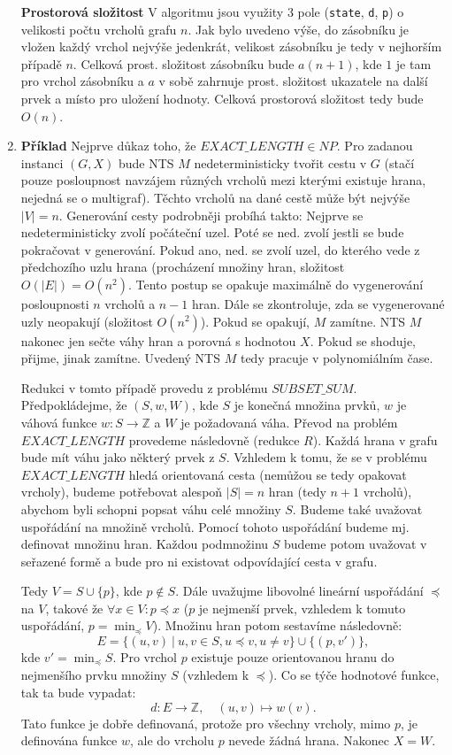 \documentclass[a4paper,12pt]{article}
\begin{document}
\begin{enumerate}[label=\textbf{\arabic*}.]
  \textbf{Prostorová složitost} 
  V algoritmu jsou využity 3 pole (\texttt{state}, \texttt{d}, \texttt{p}) o velikosti počtu vrcholů grafu $n$. Jak bylo uvedeno výše, do zásobníku je vložen
  každý vrchol nejvýše jedenkrát, velikost zásobníku je tedy v nejhorším případě $n$. Celková prost. složitost zásobníku bude
  $a(n + 1)$, kde $1$ je tam pro vrchol zásobníku a $a$ v sobě zahrnuje prost. složitost ukazatele na další prvek a místo pro 
  uložení hodnoty. Celková prostorová složitost tedy bude $O(n)$.
  
 \item {\bfseries Příklad}
  Nejprve důkaz toho, že $EXACT\_LENGTH\in NP$. Pro zadanou instanci $(G, X)$ bude NTS $M$ nedeterministicky
  tvořit cestu v $G$ (stačí pouze posloupnost navzájem různých vrcholů mezi kterými existuje hrana, nejedná se o multigraf). Těchto vrcholů
  na dané cestě může být nejvýše $|V| = n$. 
  Generování cesty podrobněji probíhá takto: Nejprve se nedeterministicky zvolí počáteční uzel. Poté se ned. zvolí jestli se bude 
  pokračovat v generování. Pokud ano, ned. se zvolí uzel, do kterého vede z předchozího uzlu hrana (procházení množiny hran, složitost $O(|E|) = O(n^2)$. 
  Tento postup se opakuje maximálně do vygenerování posloupnosti $n$ vrcholů a $n-1$ hran. Dále se zkontroluje, zda se vygenerované uzly neopakují (složitost $O(n^2)$).
  Pokud se opakují, $M$ zamítne.
  NTS $M$ nakonec jen sečte váhy hran a porovná s hodnotou $X$. Pokud
  se shoduje, přijme, jinak zamítne. Uvedený NTS $M$ tedy pracuje v polynomiálním čase.
  
  
  Redukci v tomto případě provedu z problému $SUBSET\_SUM$. Předpokládejme, že $(S, w, W)$, kde $S$ je konečná
  množina prvků, $w$ je váhová funkce $w: S\rightarrow \mathbb{Z}$ a $W$ je požadovaná váha. Převod na problém
  $EXACT\_LENGTH$ provedeme následovně (redukce $R$). Každá hrana v grafu bude mít váhu jako některý prvek z $S$. Vzhledem k tomu, 
  že se v problému $EXACT\_LENGTH$ hledá orientovaná cesta (nemůžou se tedy opakovat vrcholy),
  budeme potřebovat alespoň $|S| = n$ hran (tedy $n+1$ vrcholů), abychom byli schopni popsat váhu celé množiny $S$.
  Budeme také uvažovat uspořádání na množině vrcholů. Pomocí tohoto uspořádání budeme mj. definovat množinu hran. 
  Každou podmnožinu $S$ budeme potom uvažovat v seřazené formě a bude pro ni existovat odpovídající cesta v grafu.
  
  Tedy $V = S\cup \{p\}$, kde $p\notin S$. Dále uvažujme libovolné lineární uspořádání $\preceq$ na $V$, takové
  že $\forall x\in V: p\preceq x$ ($p$ je nejmenší prvek, vzhledem k tomuto uspořádání, $p = \min_\preceq V$).
  Množinu hran potom sestavíme následovně:
  $$
    E = \{ (u,v)\ |\ u, v \in S, u\preceq v, u\neq v \} \cup \{ (p, v') \},
  $$
  kde $v' = \min_\preceq S$. Pro vrchol $p$ existuje pouze orientovanou hranu do nejmenšího prvku množiny 
  $S$ (vzhledem k $\preceq$). Co se týče hodnotové funkce, tak ta bude vypadat:
  $$
    d: E\rightarrow \mathbb{Z},\quad (u,v) \mapsto w(v).
  $$
  Tato funkce je dobře definovaná, protože pro všechny vrcholy, mimo $p$, je definována funkce $w$, ale
  do vrcholu $p$ nevede žádná hrana. Nakonec $X = W$.
  

\end{enumerate}
\end{document}
